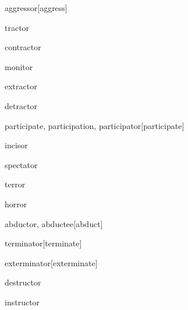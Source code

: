 \begin{RefWord}{aggressor}[aggress]
\end{RefWord}

\begin{RefWord}{tractor}
\end{RefWord}

\begin{RefWord}{contractor}
\end{RefWord}

\begin{RefWord}{monitor}
\end{RefWord}

\begin{RefWord}{extractor}
\end{RefWord}

\begin{RefWord}{detractor}
\end{RefWord}

\begin{RefWord}{participate, participation, participator}[participate]
\end{RefWord}

\begin{RefWord}{incisor}
\end{RefWord}

\begin{RefWord}{spectator}
\end{RefWord}

\begin{RefWord}{terror}
\end{RefWord}

\begin{RefWord}{horror}
\end{RefWord}

\begin{RefWord}{abductor, abductee}[abduct]
\end{RefWord}

\begin{RefWord}{terminator}[terminate]
\end{RefWord}

\begin{RefWord}{exterminator}[exterminate]
\end{RefWord}

\begin{RefWord}{destructor}
\end{RefWord}

\begin{RefWord}{instructor}
\end{RefWord}

